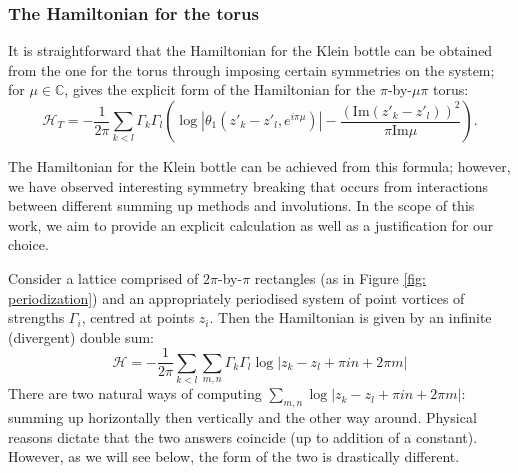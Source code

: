 \documentclass[11pt,twoside]{article}
\theoremstyle{definition}
\numberwithin{equation}{section}
\begin{document}



\subsubsection{The Hamiltonian for the torus}


It is straightforward that the Hamiltonian for the Klein bottle can be obtained from the one for the torus through imposing certain symmetries on the system; for  $\mu \in \mathbb{C}$, \cite{o1989hamiltonian} gives the explicit form of the Hamiltonian for the $\pi$-by-$\mu\pi$ torus: 
 \begin{equation}
\label{eq: Ham for torus}
\mathcal{H}_T =  -\frac{1}{2\pi}\sum_{k<l}\Gamma_k\Gamma_l\left(\log\left|\theta_1\left(z'_k-z'_l, e^{i\pi\mu}\right)\right| - \frac{\left(\mathrm{Im}(z'_k-z'_l)\right)^2}{\pi\mathrm{Im}\mu}\right).
\end{equation}


The Hamiltonian for the Klein bottle can be achieved from this formula; however, we have observed interesting symmetry breaking that occurs from interactions between different summing up methods and involutions. In the scope of this work, we aim to provide an explicit calculation as well as a justification for our choice. 

Consider a lattice comprised of $2\pi$-by-$\pi$ rectangles (as in Figure \ref{fig: periodization}) and an appropriately periodised system of point vortices of strengths $\Gamma_i$, centred at points $z_i$. Then the Hamiltonian is given by an infinite (divergent) double sum:
\begin{equation}
\label{eq: Hamiltonian tirus double sum}
\mathcal{H} = -\frac{1}{2\pi}\sum_{k<l}\sum_{m,n}\Gamma_k\Gamma_l\log\left|z_k-z_l +\pi i n + 2\pi m \right|
\end{equation}
There are two natural ways of computing  $\sum\limits_{m,n}\log\left|z_k-z_l +\pi i n + 2\pi m \right|$:  summing up horizontally then vertically and the other way around. Physical reasons dictate that the two answers  coincide (up to addition of a constant). However, as we will see below, the form of the two is  drastically different.
\end{document}
